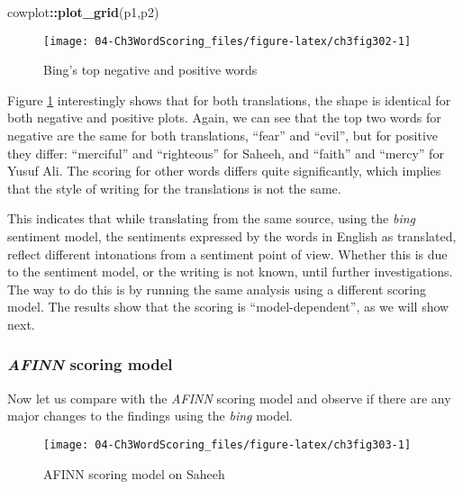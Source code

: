 \documentclass[
]{article}
\newenvironment{Shaded}{\begin{snugshade}}{\end{snugshade}}
\newcommand{\FunctionTok}[1]{\textcolor[rgb]{0.13,0.29,0.53}{\textbf{#1}}}
\newcommand{\NormalTok}[1]{#1}
\newcommand{\SpecialCharTok}[1]{\textcolor[rgb]{0.81,0.36,0.00}{\textbf{#1}}}
\begin{document}
\begin{Shaded}
\begin{Highlighting}[]
\NormalTok{cowplot}\SpecialCharTok{::}\FunctionTok{plot\_grid}\NormalTok{(p1,p2)}
\end{Highlighting}
\end{Shaded}

\begin{figure}

{\centering \texttt{[image: 04-Ch3WordScoring\_files/figure-latex/ch3fig302-1]} 

}

\caption{Bing's top negative and positive words}\label{fig:ch3fig302}
\end{figure}

Figure \ref{fig:ch3fig302} interestingly shows that for both translations, the shape is identical for both negative and positive plots. Again, we can see that the top two words for negative are the same for both translations, ``fear'' and ``evil'', but for positive they differ: ``merciful'' and ``righteous'' for Saheeh, and ``faith'' and ``mercy'' for Yusuf Ali. The scoring for other words differs quite significantly, which implies that the style of writing for the translations is not the same.

This indicates that while translating from the same source, using the \emph{bing} sentiment model, the sentiments expressed by the words in English as translated, reflect different intonations from a sentiment point of view. Whether this is due to the sentiment model, or the writing is not known, until further investigations. The way to do this is by running the same analysis using a different scoring model. The results show that the scoring is ``model-dependent'', as we will show next.

\hypertarget{afinn-scoring-model}{%
\subsubsection{\texorpdfstring{\emph{AFINN} scoring model}{AFINN scoring model}}\label{afinn-scoring-model}}

Now let us compare with the \emph{AFINN} scoring model and observe if there are any major changes to the findings using the \emph{bing} model.

\begin{figure}

{\centering \texttt{[image: 04-Ch3WordScoring\_files/figure-latex/ch3fig303-1]} 

}

\caption{AFINN scoring model on Saheeh}\label{fig:ch3fig303}
\end{figure}
\end{document}
